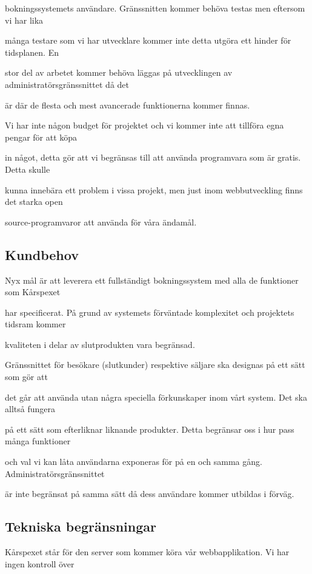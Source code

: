 \documentclass[a4paper, twoside, 11pt, titlepage]{article}
\begin{document}
	bokningssystemets användare. Gränssnitten kommer behöva testas men eftersom vi har lika

	många testare som vi har utvecklare kommer inte detta utgöra ett hinder för tidsplanen. En

	stor del av arbetet kommer behöva läggas på utvecklingen av administratörsgränssnittet då det

	är där de flesta och mest avancerade funktionerna kommer finnas.

	Vi har inte någon budget för projektet och vi kommer inte att tillföra egna pengar för att köpa

	in något, detta gör att vi begränsas till att använda programvara som är gratis. Detta skulle

	kunna innebära ett problem i vissa projekt, men just inom webbutveckling finns det starka open

	source-programvaror att använda för våra ändamål.

	\subsection{Kundbehov}


	Nyx mål är att leverera ett fullständigt bokningssystem med alla de funktioner som Kårspexet

	har specificerat. På grund av systemets förväntade komplexitet och projektets tidsram kommer

	kvaliteten i delar av slutprodukten vara begränsad.

	Gränssnittet för besökare (slutkunder) respektive säljare ska designas på ett sätt som gör att

	det går att använda utan några speciella förkunskaper inom vårt system. Det ska alltså fungera

	på ett sätt som efterliknar liknande produkter. Detta begränsar oss i hur pass många funktioner

	och val vi kan låta användarna exponeras för på en och samma gång. Administratörsgränssnittet

	är inte begränsat på samma sätt då dess användare kommer utbildas i förväg.

	\subsection{Tekniska begränsningar}


	Kårspexet står för den server som kommer köra vår webbapplikation. Vi har ingen kontroll över
\end{document}
